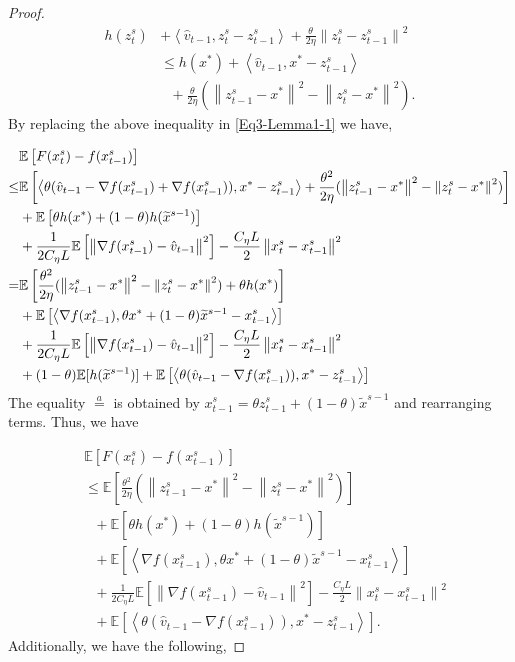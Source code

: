 \documentclass{article}
\newcommand*{\E}{\mathbb{E}}
\newcommand{\norm}[1]{\left\lVert#1\right\rVert}
\newcommand{\Iprod}[2]{\left\langle #1,#2\right\rangle}
\theoremstyle{definition}
\theoremstyle{remark}
\begin{document}
{\begin{proof}
\begin{equation}
\begin{split}
h(z_{t}^s) &+ \Iprod{\hat{v}_{t-1}}{z_{t}^s-z_{t-1}^s}+{\frac{\theta}{2\eta}}\norm{z_{t}^s-z_{t-1}^s}^2  \\
&\leq h(x^*)+\Iprod{\hat{v}_{t-1}}{x^* - z_{t-1}^s}\\
&~~~+{\frac{\theta}{2\eta}}(\norm{z_{t-1}^s-x^*}^2-\norm{z_{t}^s-x^*}^2).  
\end{split}
\end{equation}
By replacing the above inequality in \eqref{Eq3-Lemma1-1} we have,

\begin{align}\label{Eq3-Lemma1I}
&\E\left[F(x_{t}^s) -f(x_{t-1}^s)\right]\notag\\
{\leq}&\E\left[\Iprod{\theta(\hat{v}_{t-1}-\nabla f(x_{t-1}^s)+\nabla f(x_{t-1}^s))}{x^* - z_{t-1}^s}+{\frac{\theta^2}{2\eta}}(\norm{z_{t-1}^s-x^*}^2-\norm{z_{t}^s-x^*}^2)\right]\notag\\
&+\E\left[\theta h(x^*)+(1-\theta) h(\widetilde{x}^{s-1})\right]\notag\\
&+\frac{1}{2C_{\eta} L}\E\left[\norm{\nabla f(x_{t-1}^s)-\hat{v}_{t-1}}^2\right]-\frac{C_{\eta} L}{2}\norm{x_{t}^s-x_{t-1}^s}^2\\
 =& \E\left[{\frac{ \theta^2}{2\eta}}(\norm{z_{t-1}^s-x^*}^2-\norm{z_{t}^s-x^*}^2)+\theta h(x^*)\right]\notag\\
&+\E\left[\Iprod{\nabla f(x_{t-1}^s)}{\theta x^*+(1-\theta)\widetilde{x}^{s-1}-{x}^{s}_{t-1}}\right]\notag\\
&+\frac{1}{2C_{\eta} L}\E\left[\norm{\nabla f(x_{t-1}^s)-\hat{v}_{t-1}}^2\right]-\frac{C_{\eta} L}{2}\norm{x_{t}^s-x_{t-1}^s}^2\notag\\
&+(1-\theta) \E[h(\widetilde{x}^{s-1})]+\E\left[\Iprod{\theta(\hat{v}_{t-1}-\nabla f(x_{t-1}^s))}{x^* - z_{t-1}^s}\right]
\raisetag{18pt}
\end{align}
The equality $\stackrel{a}{=}$ is obtained by $x_{t-1}^s = \theta z_{t-1}^s+(1-\theta)\widetilde{x}^{s-1}$ and rearranging terms. Thus, we have

\begin{equation}\label{Eq3-Lemma1}
\begin{split}
&\E\left[F(x_{t}^s) -f(x_{t-1}^s)\right]\\
&\leq\E\left[{\frac{ \theta^2}{2\eta}}(\norm{z_{t-1}^s-x^*}^2-\norm{z_{t}^s-x^*}^2)\right]\\
&~~~+\E\left[\theta h(x^*)+(1-\theta) h(\widetilde{x}^{s-1})\right]\\
&~~~+\E\left[\Iprod{\nabla f(x_{t-1}^s)}{\theta x^*+(1-\theta)\widetilde{x}^{s-1}-{x}^{s}_{t-1}}\right]\\
&~~~+\frac{1}{2C_{\eta} L}\E\left[\norm{\nabla f(x_{t-1}^s)-\hat{v}_{t-1}}^2\right]-\frac{C_{\eta} L}{2}\norm{x_{t}^s-x_{t-1}^s}^2\\
&~~~+\E\left[\Iprod{\theta(\hat{v}_{t-1}-\nabla f(x_{t-1}^s))}{x^* - z_{t-1}^s}\right].
\end{split}
\end{equation}
Additionally, we have the following,



\end{proof}}
\end{document}
